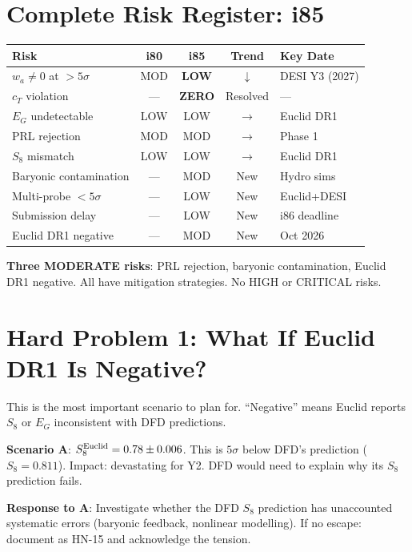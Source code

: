 \documentclass[11pt,a4paper]{article}
\begin{document}
\section{Complete Risk Register: i85}

\begin{center}
\begin{tabular}{lcccl}
\toprule
\textbf{Risk} & \textbf{i80} & \textbf{i85} & \textbf{Trend} & \textbf{Key Date} \\
\midrule
$w_a \neq 0$ at $> 5\sigma$ & MOD & \textbf{LOW} & $\downarrow$ & DESI Y3 (2027) \\
$c_T$ violation & --- & \textbf{ZERO} & Resolved & --- \\
$E_G$ undetectable & LOW & LOW & $\to$ & Euclid DR1 \\
PRL rejection & MOD & MOD & $\to$ & Phase 1 \\
$S_8$ mismatch & LOW & LOW & $\to$ & Euclid DR1 \\
Baryonic contamination & --- & MOD & New & Hydro sims \\
Multi-probe $< 5\sigma$ & --- & LOW & New & Euclid+DESI \\
Submission delay & --- & LOW & New & i86 deadline \\
Euclid DR1 negative & --- & MOD & New & Oct 2026 \\
\bottomrule
\end{tabular}
\end{center}

\textbf{Three MODERATE risks}: PRL rejection, baryonic contamination, Euclid DR1 negative. All have mitigation strategies. No HIGH or CRITICAL risks.

\section{Hard Problem 1: What If Euclid DR1 Is Negative?}

This is the most important scenario to plan for. ``Negative'' means Euclid reports $S_8$ or $E_G$ inconsistent with DFD predictions.

\textbf{Scenario A}: $S_8^{\rm Euclid} = 0.78 \pm 0.006$. This is $5\sigma$ below DFD's prediction ($S_8 = 0.811$). Impact: devastating for Y2. DFD would need to explain why its $S_8$ prediction fails.

\textbf{Response to A}: Investigate whether the DFD $S_8$ prediction has unaccounted systematic errors (baryonic feedback, nonlinear modelling). If no escape: document as HN-15 and acknowledge the tension.
\end{document}
